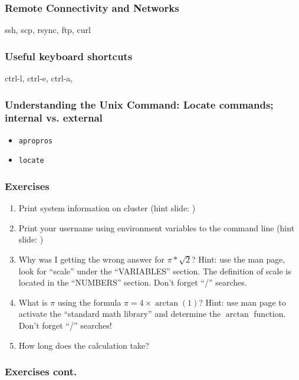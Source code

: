 \documentclass[hyperref={pdfpagelabels=false},12pt]{beamer}
\begin{document}
\begin{frame}
\frametitle{Remote Connectivity and Networks}
\centering
ssh, scp, rsync, ftp, curl
\end{frame}

\begin{frame}
\frametitle{Useful keyboard shortcuts}
\centering
ctrl-l, ctrl-e, ctrl-a, 
\end{frame}

\begin{frame}
\frametitle{Understanding the Unix Command: Locate commands; internal vs. external}
\centering
\begin{itemize}
    \item \texttt{apropros}
    \item \texttt{locate}
\end{itemize}
\end{frame}

\begin{frame}
\frametitle{Exercises}
\begin{enumerate}
    \item Print system information on cluster (hint slide: )
    \item Print your username using environment variables to the command line
    (hint slide: )
    \item Why was I getting the wrong answer for $\pi*\sqrt{2}$? Hint: use the
    man page, look for ``scale'' under the ``VARIABLES'' section. The definition
    of scale is located in the ``NUMBERS'' section. Don't forget ``/'' searches.
    \item What is $\pi$ using the formula $\pi=4\times\arctan(1)$? Hint: use
    man page to activate the ``standard math library'' and determine the
    $\arctan$ function. Don't forget ``/'' searches!  \item How long does the
    calculation take?
\end{enumerate}
\end{frame}

\begin{frame}
\frametitle{Exercises cont.}

\end{frame}
\end{document}
